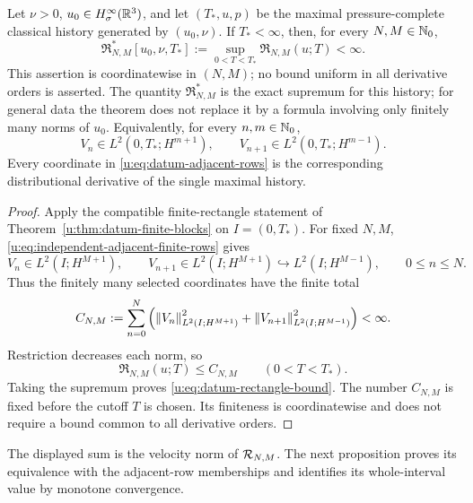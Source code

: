 \begin{theorem}
\label{u:thm:datum-rectangles}

Let \(\nu>0\), \(u_0\in H^\infty_\sigma(\mathbb R^3)\), and let
\((T_*,u,p)\) be the maximal pressure-complete classical history generated
by \((u_0,\nu)\).  If \(T_*<\infty\), then, for every
\(N,M\in\mathbb N_0\),
\begin{equation}
 \mathfrak R_{N,M}^*[u_0,\nu,T_*]
 :=\sup_{0<T<T_*}\mathfrak R_{N,M}(u;T)
 <\infty.
 \label{u:eq:datum-rectangle-bound}
\end{equation}
This assertion is coordinatewise in \((N,M)\); no bound uniform in all
derivative orders is asserted.  The quantity \(\mathfrak R_{N,M}^*\) is the
exact supremum for this history; for general data the theorem does not replace
it by a formula involving only finitely many norms of \(u_0\).
Equivalently, for every \(n,m\in\mathbb N_0\),
\begin{equation}
 V_n\in L^2(0,T_*;H^{m+1}),
 \qquad
 V_{n+1}\in L^2(0,T_*;H^{m-1}).
 \label{u:eq:datum-adjacent-rows}
\end{equation}
Every coordinate in \eqref{u:eq:datum-adjacent-rows} is the corresponding
distributional derivative of the single maximal history.
\end{theorem}


\begin{proof}
Apply the compatible finite-rectangle statement of
Theorem~\ref{u:thm:datum-finite-blocks} on \(I=(0,T_*)\).  For fixed
\(N,M\), \eqref{u:eq:independent-adjacent-finite-rows} gives
\[
 V_n\in L^2(I;H^{M+1}),\qquad
 V_{n+1}\in L^2(I;H^{M+1})\hookrightarrow L^2(I;H^{M-1}),
 \qquad 0\le n\le N.
\]
Thus the finitely many selected coordinates have the finite total
\[
 C_{N,M}:=\sum_{n=0}^N
 \left(\left\lVert V_n\right\rVert_{L^2(I;H^{M+1})}^2
       +\left\lVert V_{n+1}\right\rVert_{L^2(I;H^{M-1})}^2\right)<\infty.
\]
Restriction decreases each norm, so
\[
 \mathfrak R_{N,M}(u;T)\le C_{N,M}
 \qquad(0<T<T_*).
\]
Taking the supremum proves \eqref{u:eq:datum-rectangle-bound}.
The number \(C_{N,M}\) is fixed before the cutoff \(T\) is chosen.
Its finiteness is coordinatewise and does not require a bound common to all
derivative orders.
\end{proof}

The displayed sum is the velocity norm of \(\mathcal R_{N,M}\).  The next proposition
proves its equivalence with the adjacent-row memberships and identifies its
whole-interval value by monotone convergence.

